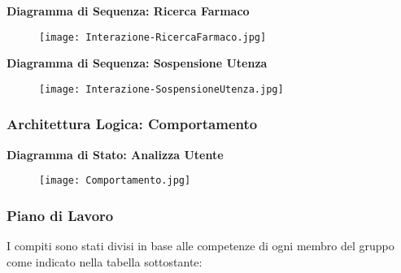 \textbf{Diagramma di Sequenza: Ricerca Farmaco}

\begin{figure}[h!]
    \begin{center}
        \texttt{[image: Interazione-RicercaFarmaco.jpg]}
    \end{center}
\end{figure}
\hfill \break

\textbf{Diagramma di Sequenza: Sospensione Utenza}

\begin{figure}[h!]
    \begin{center}
        \texttt{[image: Interazione-SospensioneUtenza.jpg]}
    \end{center}
\end{figure}
\hfill \break

\newpage
\subsubsection{Architettura Logica: Comportamento}
\hfill \break

\textbf{Diagramma di Stato: Analizza Utente}

\begin{figure}[h!]
    \begin{center}
        \texttt{[image: Comportamento.jpg]}
    \end{center}
\end{figure}
\hfill \break

\newpage
\subsubsection{Piano di Lavoro}

I compiti sono stati divisi in base alle competenze di 
ogni membro del gruppo come indicato nella tabella sottostante:\\

